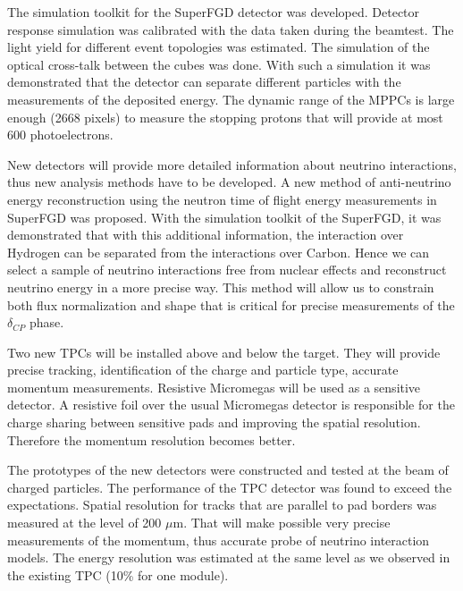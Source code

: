 \documentclass[./main.tex]{subfiles}
\begin{document}
The simulation toolkit for the SuperFGD detector was developed. Detector response simulation was calibrated with the data taken during the beamtest. The light yield for different event topologies was estimated. The simulation of the optical cross-talk between the cubes was done. With such a simulation it was demonstrated that the detector can separate different particles with the measurements of the deposited energy. The dynamic range of the MPPCs is large enough (2668 pixels) to measure the stopping protons that will provide at most 600 photoelectrons.

New detectors will provide more detailed information about neutrino interactions, thus new analysis methods have to be developed. A new method of anti-neutrino energy reconstruction using the neutron time of flight energy measurements in SuperFGD was proposed. With the simulation toolkit of the SuperFGD, it was demonstrated that with this additional information, the interaction over Hydrogen can be separated from the interactions over Carbon. Hence we can select a sample of neutrino interactions free from nuclear effects and reconstruct neutrino energy in a more precise way. This method will allow us to constrain both flux normalization and shape that is critical for precise measurements of the $\delta_{CP}$ phase.

Two new TPCs will be installed above and below the target. They will provide precise tracking, identification of the charge and particle type, accurate momentum measurements. Resistive Micromegas will be used as a sensitive detector. A resistive foil over the usual Micromegas detector is responsible for the charge sharing between sensitive pads and improving the spatial resolution. Therefore the momentum resolution becomes better.

The prototypes of the new detectors were constructed and tested at the beam of charged particles. The performance of the TPC detector was found to exceed the expectations. Spatial resolution for tracks that are parallel to pad borders was measured at the level of 200 $\mu$m. That will make possible very precise measurements of the momentum, thus accurate probe of neutrino interaction models. The energy resolution was estimated at the same level as we observed in the existing TPC (10\% for one module).
\end{document}
